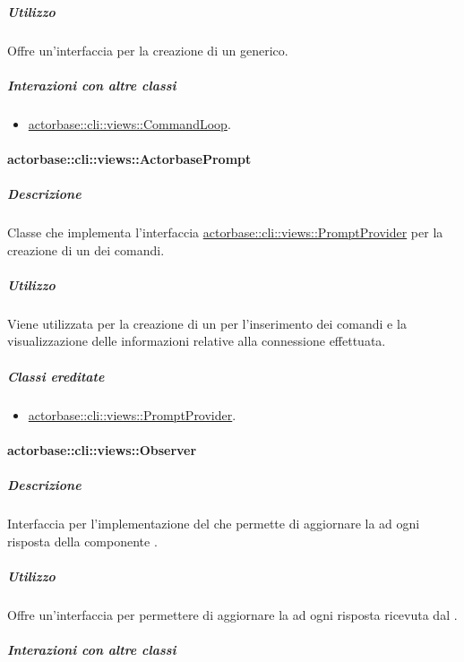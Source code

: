 \documentclass{scalatekids-article}
\begin{document}
\subparagraph{Utilizzo}

Offre un'interfaccia per la creazione di un  generico.

\subparagraph{Interazioni con altre classi}

\begin{itemize}
\item \hyperref[sec:actorbase::cli::views::CommandLoop]{actorbase::cli::views::CommandLoop}.
\end{itemize}

\paragraph{actorbase::cli::views::ActorbasePrompt}
\label{sec:actorbase::cli::views::ActorbasePrompt}

\subparagraph{Descrizione}

Classe che implementa l'interfaccia \hyperref[sec:actorbase::cli::views::PromptProvider]{actorbase::cli::views::PromptProvider} per
la creazione di un  dei comandi.

\subparagraph{Utilizzo}

Viene utilizzata per la creazione di un  per l'inserimento dei
comandi e la visualizzazione delle informazioni relative alla connessione
effettuata. %

\subparagraph{Classi ereditate}

\begin{itemize}
\item \hyperref[sec:actorbase::cli::views::PromptProvider]{actorbase::cli::views::PromptProvider}.
\end{itemize}

\paragraph{actorbase::cli::views::Observer}
\label{sec:actorbase::cli::views::Observer}

\subparagraph{Descrizione}

Interfaccia per l'implementazione del  
che permette di aggiornare la  ad ogni risposta della componente
.

\subparagraph{Utilizzo}

Offre un'interfaccia per permettere di aggiornare la  ad ogni
risposta ricevuta dal .

\subparagraph{Interazioni con altre classi}
\end{document}
